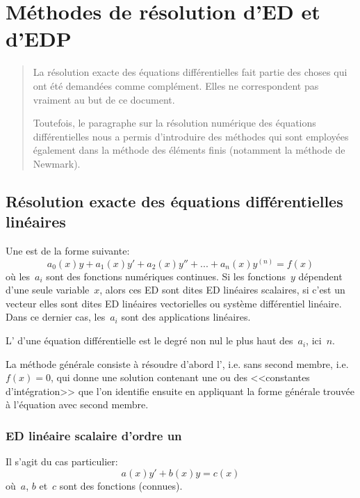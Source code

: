 \chapter{Méthodes de résolution d'ED et d'EDP}\label{Ch-ED}
\begin{abstract}
La résolution exacte des équations différentielles fait partie des choses qui ont été demandées comme
complément. Elles ne correspondent pas vraiment au but de ce document.

Toutefois, le paragraphe sur la résolution numérique des équations différentielles nous a permis
d'introduire des méthodes qui sont employées également dans la méthode des éléments finis (notamment
la méthode de Newmark).
\end{abstract}

\medskip
\section{Résolution exacte des équations différentielles linéaires}

Une  est de la forme suivante:
\begin{equation}
  a_0(x) y + a_1(x) y' + a_2(x) y'' + ... + a_n(x) y^{(n)}= f(x)
\end{equation}
où les~$a_i$ sont des fonctions numériques continues.
Si les fonctions~$y$ dépendent d'une seule variable~$x$, alors ces ED sont dites
ED linéaires scalaires, si c'est un vecteur elles sont dites ED linéaires vectorielles
ou système différentiel linéaire. Dans ce dernier cas, les~$a_i$ sont des applications
linéaires.

L' d'une équation différentielle est le degré non nul le plus haut des~$a_i$, ici~$n$.

\medskip
La méthode générale consiste à résoudre d'abord l', 
i.e. sans second membre, i.e.~$f(x)=0$, qui donne une solution contenant une ou des <<constantes
d'intégration>> que l'on identifie ensuite en appliquant la forme générale trouvée à
l'équation avec second membre.


\medskip
\subsection{ED linéaire scalaire d'ordre un}

Il s'agit du cas particulier:
\begin{equation}
  a(x)y' + b(x)y = c(x)
\end{equation}
où~$a$, $b$ et~$c$ sont des fonctions (connues).

